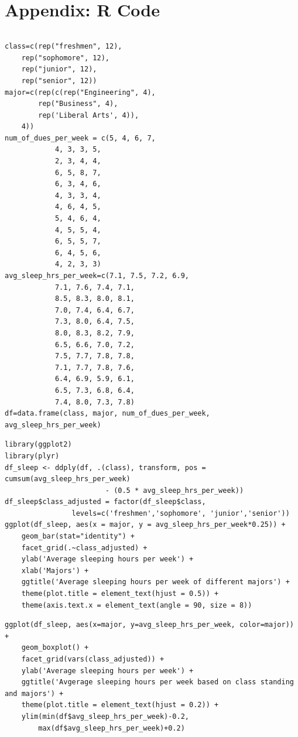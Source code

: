 \documentclass{article} %
\begin{document}
\[\]

\section{Appendix: R Code}

\[\]

\appendix

\lstset{language=R}
\lstset{showstringspaces=false}
\lstset{frame=lines}
\lstset{basicstyle=\footnotesize}
\begin{lstlisting}
class=c(rep("freshmen", 12), 
	rep("sophomore", 12),
	rep("junior", 12),
	rep("senior", 12))
major=c(rep(c(rep("Engineering", 4), 
		rep("Business", 4),
		rep('Liberal Arts', 4)),
	4))
num_of_dues_per_week = c(5, 4, 6, 7,
			4, 3, 3, 5,
			2, 3, 4, 4,
			6, 5, 8, 7,
			6, 3, 4, 6,
			4, 3, 3, 4,
			4, 6, 4, 5,
			5, 4, 6, 4,
			4, 5, 5, 4,
			6, 5, 5, 7,
			6, 4, 5, 6,
			4, 2, 3, 3)
avg_sleep_hrs_per_week=c(7.1, 7.5, 7.2, 6.9, 
			7.1, 7.6, 7.4, 7.1,
			8.5, 8.3, 8.0, 8.1,
			7.0, 7.4, 6.4, 6.7,
			7.3, 8.0, 6.4, 7.5,
			8.0, 8.3, 8.2, 7.9,
			6.5, 6.6, 7.0, 7.2,
			7.5, 7.7, 7.8, 7.8,
			7.1, 7.7, 7.8, 7.6,
			6.4, 6.9, 5.9, 6.1,
			6.5, 7.3, 6.8, 6.4,
			7.4, 8.0, 7.3, 7.8)
df=data.frame(class, major, num_of_dues_per_week, avg_sleep_hrs_per_week)
\end{lstlisting}


\lstset{language=R}
\lstset{frame=lines}
\lstset{basicstyle=\footnotesize}
\begin{lstlisting}
library(ggplot2)
library(plyr)
df_sleep <- ddply(df, .(class), transform, pos = cumsum(avg_sleep_hrs_per_week) 
						- (0.5 * avg_sleep_hrs_per_week)) 
df_sleep$class_adjusted = factor(df_sleep$class, 
			    levels=c('freshmen','sophomore', 'junior','senior'))
ggplot(df_sleep, aes(x = major, y = avg_sleep_hrs_per_week*0.25)) + 
	geom_bar(stat="identity") + 
	facet_grid(.~class_adjusted) +
	ylab('Average sleeping hours per week') + 
	xlab('Majors') +
	ggtitle('Average sleeping hours per week of different majors') +
	theme(plot.title = element_text(hjust = 0.5)) +
	theme(axis.text.x = element_text(angle = 90, size = 8))
\end{lstlisting}


\lstset{language=R}
\lstset{frame=lines}
\lstset{basicstyle=\footnotesize}
\begin{lstlisting}
ggplot(df_sleep, aes(x=major, y=avg_sleep_hrs_per_week, color=major)) +
	geom_boxplot() +
	facet_grid(vars(class_adjusted)) +
	ylab('Average sleeping hours per week') +
	ggtitle('Avgerage sleeping hours per week based on class standing and majors') +
	theme(plot.title = element_text(hjust = 0.2)) +
	ylim(min(df$avg_sleep_hrs_per_week)-0.2, 
		max(df$avg_sleep_hrs_per_week)+0.2)
\end{lstlisting}
\end{document}
